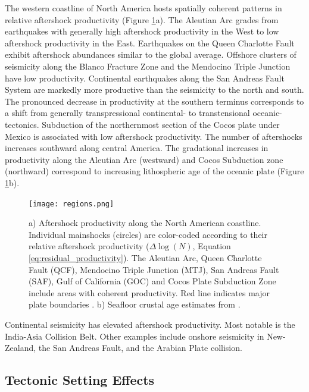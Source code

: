 \documentclass[draft, jgrga]{agujournal2018}
\begin{document}
    The western coastline of North America hosts spatially coherent patterns in relative aftershock productivity (Figure \ref{fig:region}a). The Aleutian Arc grades from earthquakes with generally high aftershock productivity in the West to low aftershock productivity in the East. Earthquakes on the Queen Charlotte Fault exhibit aftershock abundances similar to the global average. Offshore clusters of seismicity along the Blanco Fracture Zone and the Mendocino Triple Junction have low productivity. Continental earthquakes along the San Andreas Fault System are markedly more productive than the seismicity to the north and south. The pronounced decrease in productivity at the southern terminus corresponds to a shift from generally transpressional continental- to transtensional oceanic-tectonics. Subduction of the northernmost section of the Cocos plate under Mexico is associated with low aftershock productivity. The number of aftershocks increases southward along central America. The gradational increases in productivity along the Aleutian Arc (westward) and Cocos Subduction zone (northward) correspond to increasing lithospheric age of the oceanic plate (Figure \ref{fig:region}b).

    \begin{figure}
        \centering
        \texttt{[image: regions.png]}
        \caption{a) Aftershock productivity along the North American coastline.  Individual mainshocks (circles) are color-coded according to their relative aftershock productivity ($\Delta \log(N)$, Equation \ref{eq:residual_productivity}). The Aleutian Arc, Queen Charlotte Fault (QCF), Mendocino Triple Junction (MTJ), San Andreas Fault (SAF), Gulf of California (GOC) and Cocos Plate Subduction Zone include areas with coherent productivity. Red line indicates major plate boundaries \citep{Bird2003AnBoundaries}. b) Seafloor crustal age estimates from \citet{Muller2008}.}
        \label{fig:region}
    \end{figure}

    Continental seismicity has elevated aftershock productivity. Most notable is the India-Asia Collision Belt. Other examples include onshore seismicity in New-Zealand, the San Andreas Fault, and the Arabian Plate collision.

    \subsection{Tectonic Setting Effects}\label{sec:tectonic_setting}
\end{document}
